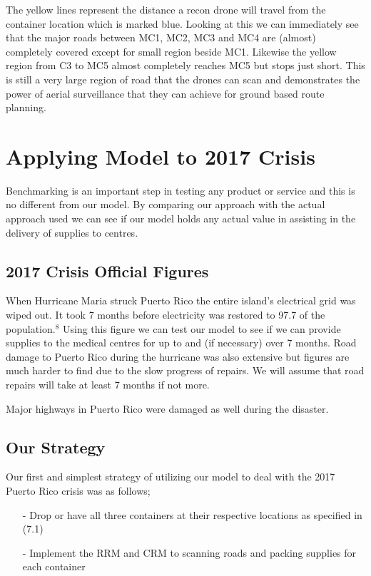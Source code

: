 \documentclass[a4paper,12pt]{article}
\begin{document}
The yellow lines represent the distance a recon drone will travel from the container location which is marked blue. Looking at this we can immediately see that the major roads
between MC1, MC2, MC3 and MC4 are (almost) completely covered except for small region beside MC1.
Likewise the yellow region from C3 to MC5 almost completely reaches MC5 but stops just short. This is still a very large region of road that the drones can scan
and demonstrates the power of aerial surveillance that they can achieve for ground based route planning.


\newpage

\section{Applying Model to 2017 Crisis}
Benchmarking is an important step in testing any product or service and this is no different from our model. By comparing our approach with the actual approach used we can see if our model holds any actual value in assisting
in the delivery of supplies to centres.

\subsection{2017 Crisis Official Figures}
When Hurricane Maria struck Puerto Rico the entire island's electrical grid was wiped out. It took 7 months before electricity was restored to 97.7 %
of the population.$^8$ Using this figure we can test our model to see if we can provide supplies to the medical centres for up to and (if necessary) over 7 months.
Road damage to Puerto Rico during the hurricane was also extensive but figures are much harder to find due to the slow progress of repairs. We will assume that road repairs will take at
least 7 months if not more.

Major highways in Puerto Rico were damaged as well during the disaster.

\subsection{Our Strategy}
Our first and simplest strategy of utilizing our model to deal with the 2017 Puerto Rico crisis was as follows;

\begin{itemize}
\item[-]Drop or have all three containers at their respective locations as specified in (7.1)
\item[-]Implement the RRM and CRM to scanning roads and packing supplies for each container
\end{itemize}
\end{document}
